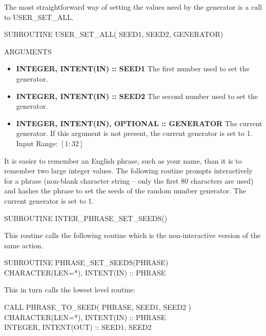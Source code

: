 \documentclass[12pt,dvips]{article}
\newcommand{\myitem}[1]{\item{\bf \color{Violet} #1 \normalcolor}}
\newcommand{\inrange}[2]{\hfill Input Range: \ensuremath{\left[ #1:#2
\right]}\\}
\begin{document}
The most straightforward  way  of  setting  the  values  need  by  the
generator is a call to USER\_SET\_ALL.
\vspace{0.2in}

SUBROUTINE USER\_SET\_ALL( SEED1, SEED2, GENERATOR)

\vspace{0.2in}
{\centering  ARGUMENTS\\}
\vspace{0.1in}

\begin{itemize}

\myitem{INTEGER, INTENT(IN) :: SEED1} The first number used to set the
generator.

\myitem{INTEGER, INTENT(IN) :: SEED2} The second number used to set the
generator.

\myitem{INTEGER, INTENT(IN), OPTIONAL :: GENERATOR} The current
generator.  If this argument is not present, the current generator is
set to 1.
\inrange{1}{32}

\end{itemize}

It is easier to remember an English phrase, such as your name, than it
is  to  remember two large  integer   values.   The following  routine
prompts interactively for a phrase (non-blank character string -- only
the first 80  characters are used)  and hashes the  phrase  to set the
seeds of the random number generator.  The current generator is set to
1.

\vspace{0.2in}
SUBROUTINE INTER\_PHRASE\_SET\_SEEDS()
\vspace{0.2in}

This routine calls the following routine which is the non-interactive
version of the same action.

\vspace{0.2in}
SUBROUTINE PHRASE\_SET\_SEEDS(PHRASE)\\
\hspace{0.5in} CHARACTER(LEN=*), INTENT(IN) :: PHRASE
\vspace{0.2in}

This in turn calls the lowest level routine:

\vspace{0.2in}
CALL PHRASE\_TO\_SEED( PHRASE, SEED1, SEED2 )\\
\hspace{0.5in} CHARACTER(LEN=*), INTENT(IN) :: PHRASE\\
\hspace{0.5in} INTEGER, INTENT(OUT) :: SEED1, SEED2
\vspace{0.2in}
\end{document}
